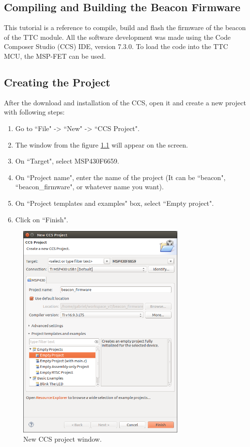 \documentclass[12pt]{book}
\begin{document}
\begin{appendices}
\chapter{Compiling and Building the Beacon Firmware}

This tutorial is a reference to compile, build and flash the firmware of the beacon of the TTC module. All the software development was made using the Code Composer Studio (CCS) IDE, version 7.3.0. To load the code into the TTC MCU, the MSP-FET can be used.

\section{Creating the Project}

After the download and installation of the CCS, open it and create a new project with following steps:

\begin{enumerate}
    \item Go to ``File" -> ``New" -> ``CCS Project".
    \item The window from the figure \ref{fig:compiling-tutorial} will appear on the screen.
    \item On ``Target", select MSP430F6659.
    \item On ``Project name", enter the name of the project (It can be ``beacon", ``beacon\_firmware", or whatever name you want).
    \item On ``Project templates and examples" box, select ``Empty project".
    \item Click on ``Finish".
\end{enumerate}

\begin{figure}[!h]
	\begin{center}
		\includegraphics[width=0.75\textwidth]{figures/ccs_project.png}
		\caption{New CCS project window.}
		\label{fig:compiling-tutorial}
	\end{center}
\end{figure}


\end{appendices}
\end{document}
